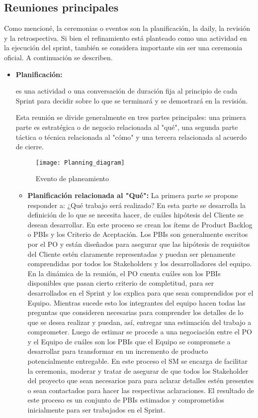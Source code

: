 \subsection{Reuniones principales}

Como mencioné, la ceremonias o eventos son la planificación, la daily, la revisión y la retrospectiva. Si bien el refinamiento está planteado como una actividad en la ejecución del sprint, también se considera importante sin ser una ceremonia oficial. A continuación se describen.

\begin{itemize}

\item \textbf{Planificación:} {es una actividad o una conversación de duración fija al principio de cada Sprint para decidir sobre lo que se terminará y se demostrará en la revisión.

Esta reunión se divide generalmente en tres partes principales: una primera parte es estratégica o de negocio relacionada al "qué", una segunda parte táctica o técnica relacionada al "cómo" y una tercera relacionada al acuerdo de cierre. 

\begin{figure}[h]
  \centering
  \texttt{[image: Planning\_diagram]}
  \caption{Evento de planeamiento}
  \centering
  \label{fig:Planning_diagram} %
\end{figure}
\FloatBarrier
}

\begin{itemize}

\item \textbf{Planificación relacionada al "Qué":} La primera parte se propone responder a: ¿Qué trabajo será realizado? En esta parte se desarrolla la definición de lo que se necesita hacer, de cuáles hipótesis del Cliente se desean desarrollar. En este proceso se crean los ítems de Product Backlog o PBIs y los Criterio de Aceptación. Los PBIs son generalmente escritos por el PO y están diseñados para asegurar que las hipótesis de requisitos del Cliente estén claramente representadas y puedan ser plenamente comprendidas por todos los Stakeholders y los desarrolladores del equipo.
En la dinámica de la reunión, el PO cuenta cuáles son los PBIs disponibles que pasan cierto criterio de completitud, para ser desarrollados en el Sprint y los explica para que sean comprendidos por el Equipo. Mientras sucede esto los integrantes del equipo hacen todas las preguntas que consideren necesarias para comprender los detalles de lo que se desea realizar y puedan, así, entregar una estimación del trabajo a comprometer. Luego de estimar se procede a una negociación entre el PO y el Equipo de cuáles son los PBIs que el Equipo se compromete a desarrollar para transformar en un incremento de producto potencialmente entregable. En este proceso el SM se encarga de facilitar la ceremonia, moderar y tratar de asegurar de que todos los Stakeholder del proyecto que sean necesarios para para aclarar detalles estén presentes o sean contactados para hacer las respectivas aclaraciones.
El resultado de este proceso es un conjunto de PBIs estimados y comprometidos inicialmente para ser trabajados en el Sprint.


\end{itemize}
\end{itemize}
